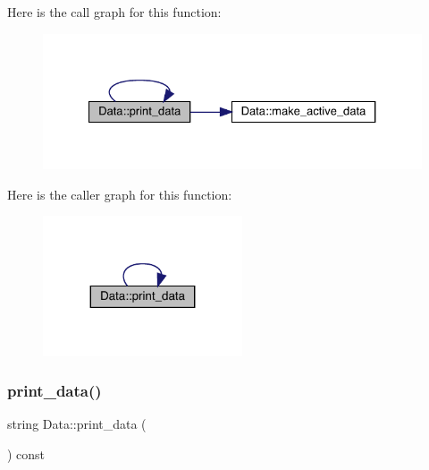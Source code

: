 Here is the call graph for this function\+:
\nopagebreak
\begin{figure}[H]
\begin{center}
\leavevmode
\includegraphics[width=327pt]{d0/df3/classData_a255a7abe193d5dfbd77fb957942bda64_cgraph}
\end{center}
\end{figure}
Here is the caller graph for this function\+:
\nopagebreak
\begin{figure}[H]
\begin{center}
\leavevmode
\includegraphics[width=167pt]{d0/df3/classData_a255a7abe193d5dfbd77fb957942bda64_icgraph}
\end{center}
\end{figure}
\mbox{\label{classData_a255a7abe193d5dfbd77fb957942bda64}} 
\subsubsection{\texorpdfstring{print\_data()}{print\_data()}\hspace{0.1cm}{\footnotesize\ttfamily [4/4]}}
{\footnotesize\ttfamily string Data\+::print\+\_\+data (\begin{DoxyParamCaption}{ }\end{DoxyParamCaption}) const\hspace{0.3cm}{\ttfamily [inline]}}

